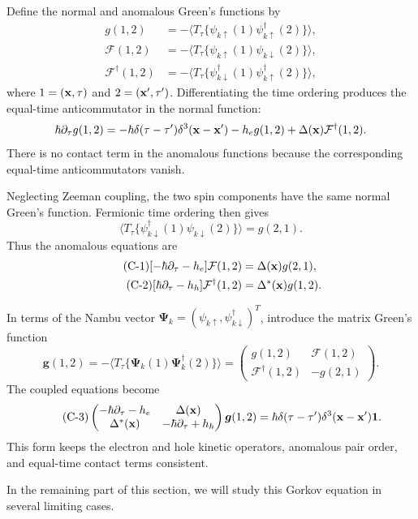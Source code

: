 Define the normal and anomalous Green's functions by
\[\begin{split}
g(1,2)&=-\langle T_\tau\{\psi_{k\uparrow}(1)\psi^\dagger_{k\uparrow}(2)\}\rangle,\\
\mathcal F(1,2)&=-\langle T_\tau\{\psi_{k\uparrow}(1)\psi_{k\downarrow}(2)\}\rangle,\\
\mathcal F^\dagger(1,2)&=-\langle T_\tau\{\psi^\dagger_{k\downarrow}(1)\psi^\dagger_{k\uparrow}(2)\}\rangle,
\end{split}\]
where $1=({\bf x},\tau)$ and $2=({\bf x}',\tau')$. Differentiating the time ordering produces the equal-time anticommutator in the normal function:
\[\hbar\partial_\tau g(1,2)=-\hbar\delta(\tau-\tau')\delta^3({\bf x-x'})-h_eg(1,2)+\Delta({\bf x})\mathcal F^\dagger(1,2).\]
There is no contact term in the anomalous functions because the corresponding equal-time anticommutators vanish.

Neglecting Zeeman coupling, the two spin components have the same normal Green's function. Fermionic time ordering then gives
\[\langle T_\tau\{\psi^\dagger_{k\downarrow}(1)\psi_{k\downarrow}(2)\}\rangle=g(2,1).\]
Thus the anomalous equations are
\begin{align}
\tag{C-1}
[-\hbar\partial_\tau-h_e]\mathcal F(1,2)&=\Delta({\bf x})g(2,1),\\
\tag{C-2}
[\hbar\partial_\tau-h_h]\mathcal F^\dagger(1,2)&=\Delta^*({\bf x})g(1,2).
\end{align}

In terms of the Nambu vector $\bm\Psi_k=(\psi_{k\uparrow},\psi^\dagger_{k\downarrow})^T$, introduce the matrix Green's function
\[\bm g(1,2)=-\langle T_\tau\{\bm\Psi_k(1)\bm\Psi_k^\dagger(2)\}\rangle
=\begin{pmatrix}g(1,2)&\mathcal F(1,2)\\\mathcal F^\dagger(1,2)&-g(2,1)\end{pmatrix}.\]
The coupled equations become
\begin{align}\tag{C-3}
\begin{pmatrix}-\hbar\partial_\tau-h_e&\Delta({\bf x})\\
\Delta^*({\bf x})&-\hbar\partial_\tau+h_h\end{pmatrix}\bm g(1,2)
=\hbar\delta(\tau-\tau')\delta^3({\bf x-x'})\bm 1.
\end{align}
This form keeps the electron and hole kinetic operators, anomalous pair order, and equal-time contact terms consistent.

In the remaining part of this section, we will study this Gorkov equation in several limiting cases.

